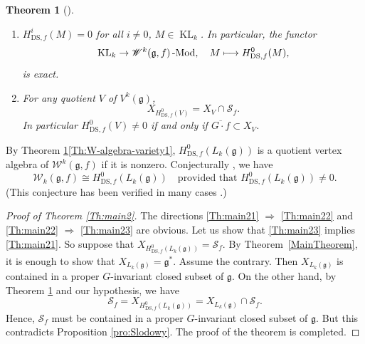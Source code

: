 \documentclass[JEP,XML,SOM,Unicode]{cedram}
\newcommand\mto{\mathchoice{\longmapsto}{\mapsto}{\mapsto}{\mapsto}}
\newcommand{\DS}{\mathrm{DS}}
\let\on\operatorname
\newcommand \g{\mathfrak g}
\newcommand \W{\mathscr{W}}
\newtheorem{theorem}{Theorem}[section]
\theoremstyle{definition}
\begin{document}
\skpt
\begin{theorem}[{\cite{Ara09b}}]
\label{Th:W-algebra-variety}
\begin{enumerate}
\item\label{Th:W-algebra-variety1} $H_{\DS,f}^i(M)=0$ for all $i\ne 0$, $M\in
\on{KL}_k$.
In particular, the functor
\[
\on{KL}_k\to\W^k(\g,f)\on{-Mod},\quad M\mto
H_{\DS,f}^{0}(M),
\]
is exact.
\item\label{Th:W-algebra-variety2}
For any quotient $V$ of $V^k(\g)$,
\begin{equation*}
X_{H^{0}_{\DS,f}(V)}=X_{V}\cap \mathscr{S}_{f}.
\end{equation*}
In particular
$H_{\DS,f}^{0}(V)
\ne 0$ if and only if
$\overline{G\cdot f}\subset X_V$.
\label{item:intersection}
\end{enumerate}
\end{theorem}

By Theorem \ref{Th:W-algebra-variety}\eqref{Th:W-algebra-variety1},
$H^{0}_{\DS,f}(L_k(\g))$ is a quotient vertex algebra of $\W^k(\g,f)$ if it is nonzero.
Conjecturally \cite{KacRoaWak03,KacWak08},
we have
\begin{equation*}
\W_k(\g,f)\cong H^{0}_{\DS,f}(L_k(\g))\quad\text{provided that }H^{0}_{\DS,f}(L_k(\g))\ne 0.
\end{equation*}
(This conjecture has been verified in many cases \cite{Ara05,Ara07,Ara08-a,AEkeren19}.)

\begin{proof}[Proof of Theorem \ref{Th:main2}]
The directions \eqref{Th:main21} $\Rightarrow$ \eqref{Th:main22}
and \eqref{Th:main22} $\Rightarrow$ \eqref{Th:main23} are obvious.
Let us show that \eqref{Th:main23} implies \eqref{Th:main21}.
So suppose that $X_{H^{0}_{\DS,f}(L_k(\g))}=\mathscr{S}_f$.
By Theorem~\ref{MainTheorem}, it is enough to show that $X_{L_k(\g)}=\g^*$.
Assume the contrary. Then $X_{L_k(\g)}$ is contained in a proper
$G$-invariant closed subset of $\g$.
On the other hand, by Theorem \ref{Th:W-algebra-variety} and our hypothesis,
we have
\[
\mathscr{S}_f=X_{H^{0}_{\DS,f}(L_k(\g))}= X_{L_k(\g)} \cap \mathscr{S}_f.
\]
Hence, $ \mathscr{S}_f$ must be contained
in a proper
$G$-invariant closed subset of $\g$. But this contradicts Proposition \ref{pro:Slodowy}.
The proof of the theorem is completed.
\end{proof}

\backmatter
\nocite{Mus01}


\end{document}
